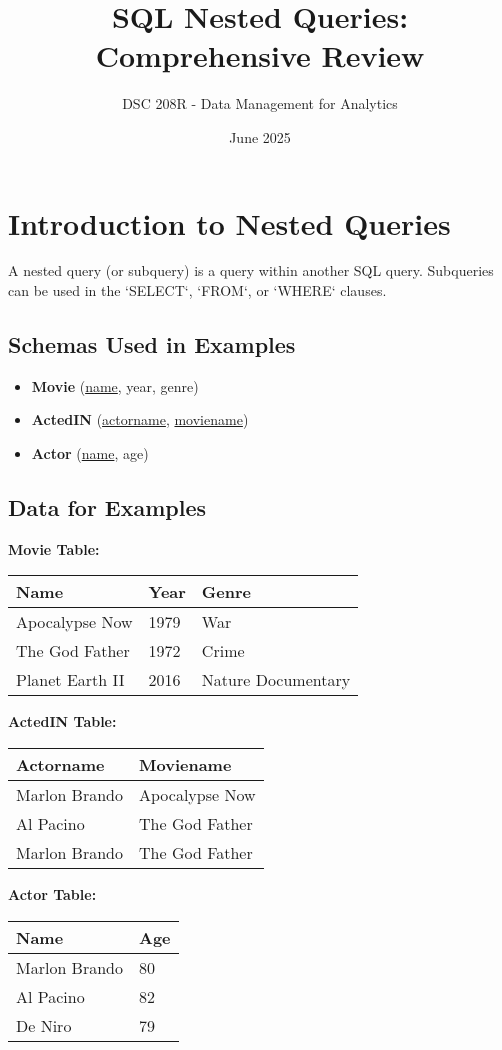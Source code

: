 \documentclass{article}
\title{SQL Nested Queries: Comprehensive Review}
\author{DSC 208R - Data Management for Analytics}
\date{June 2025}
\begin{document}
\maketitle

\section*{Introduction to Nested Queries}
A nested query (or subquery) is a query within another SQL query. Subqueries can be used in the `SELECT`, `FROM`, or `WHERE` clauses.

\subsection*{Schemas Used in Examples}
\begin{itemize}
    \item \textbf{Movie} (\underline{name}, year, genre) 
    \item \textbf{ActedIN} (\underline{actorname}, \underline{moviename}) 
    \item \textbf{Actor} (\underline{name}, age) 
\end{itemize}

\subsection*{Data for Examples}
\textbf{Movie Table:} 
\begin{tabular}{|l|l|l|}
    \hline
    \textbf{Name} & \textbf{Year} & \textbf{Genre} \\
    \hline
    Apocalypse Now & 1979 & War \\
    The God Father & 1972 & Crime \\
    Planet Earth II & 2016 & Nature Documentary \\
    \hline
\end{tabular}

\textbf{ActedIN Table:} 
\begin{tabular}{|l|l|}
    \hline
    \textbf{Actorname} & \textbf{Moviename} \\
    \hline
    Marlon Brando & Apocalypse Now \\
    Al Pacino & The God Father \\
    Marlon Brando & The God Father \\
    \hline
\end{tabular}

\textbf{Actor Table:} 
\begin{tabular}{|l|l|}
    \hline
    \textbf{Name} & \textbf{Age} \\
    \hline
    Marlon Brando & 80 \\
    Al Pacino & 82 \\
    De Niro & 79 \\
    \hline
\end{tabular}
\end{document}
